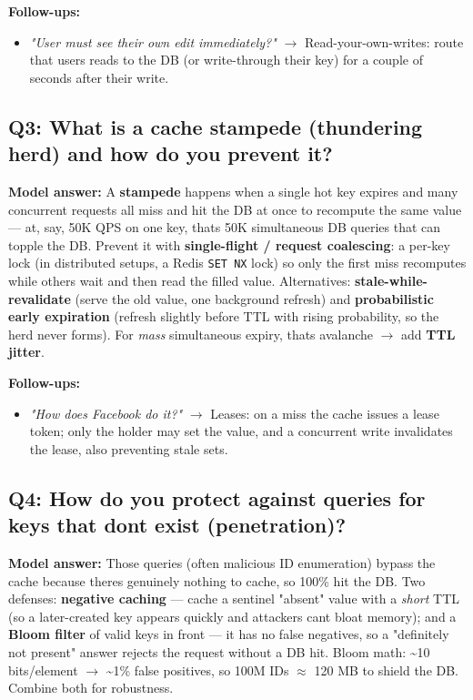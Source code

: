 \documentclass[11pt]{article}
\providecommand{\tightlist}{\setlength{\itemsep}{1pt}\setlength{\parskip}{0pt}}
\begin{document}
\textbf{Follow-ups:}

\begin{itemize}
\tightlist
\item
  \emph{"User must see their own edit immediately?"} \(\rightarrow\) Read-your-own-writes: route that user\textquotesingle s reads to the DB (or write-through their key) for a couple of seconds after their write.
\end{itemize}

\subsection{Q3: What is a cache stampede (thundering herd) and how do you prevent it?}\label{q3-what-is-a-cache-stampede-thundering-herd-and-how-do-you-prevent-it}

\textbf{Model answer:} A \textbf{stampede} happens when a single hot key expires and many concurrent requests all miss and hit the DB at once to recompute the same value --- at, say, 50K QPS on one key, that\textquotesingle s 50K simultaneous DB queries that can topple the DB. Prevent it with \textbf{single-flight / request coalescing}: a per-key lock (in distributed setups, a Redis \texttt{SET\ NX} lock) so only the first miss recomputes while others wait and then read the filled value. Alternatives: \textbf{stale-while-revalidate} (serve the old value, one background refresh) and \textbf{probabilistic early expiration} (refresh slightly before TTL with rising probability, so the herd never forms). For \emph{mass} simultaneous expiry, that\textquotesingle s avalanche \(\rightarrow\) add \textbf{TTL jitter}.

\textbf{Follow-ups:}

\begin{itemize}
\tightlist
\item
  \emph{"How does Facebook do it?"} \(\rightarrow\) Leases: on a miss the cache issues a lease token; only the holder may set the value, and a concurrent write invalidates the lease, also preventing stale sets.
\end{itemize}

\subsection{Q4: How do you protect against queries for keys that don\textquotesingle t exist (penetration)?}\label{q4-how-do-you-protect-against-queries-for-keys-that-dont-exist-penetration}

\textbf{Model answer:} Those queries (often malicious ID enumeration) bypass the cache because there\textquotesingle s genuinely nothing to cache, so 100\% hit the DB. Two defenses: \textbf{negative caching} --- cache a sentinel "absent" value with a \emph{short} TTL (so a later-created key appears quickly and attackers can\textquotesingle t bloat memory); and a \textbf{Bloom filter} of valid keys in front --- it has no false negatives, so a "definitely not present" answer rejects the request without a DB hit. Bloom math: \textasciitilde10 bits/element \(\rightarrow\) \textasciitilde1\% false positives, so 100M IDs \(\approx\) 120 MB to shield the DB. Combine both for robustness.
\end{document}

